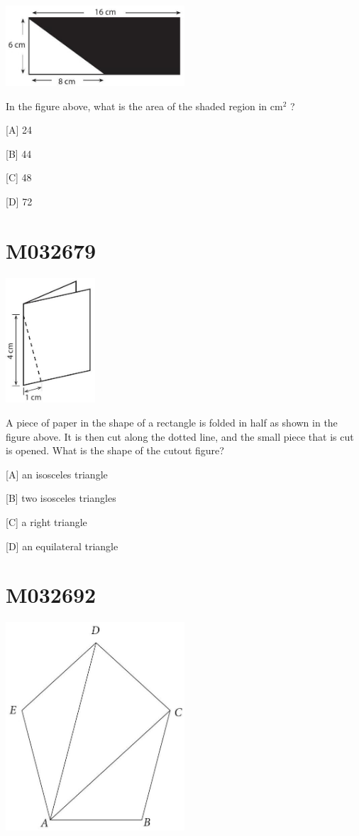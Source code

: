 \documentclass[12pt]{article}
\begin{document}
\includegraphics[max width=0.5\textwidth]{2024_02_20_828ebc9d68bcc1fbb223g-58}


In the figure above, what is the area of the shaded region in $\mathrm{cm}^{2}$ ?

[A] 24

[B] 44

[C] 48

[D] 72

\newpage
\section*{M032679}


\includegraphics[max width=0.25\textwidth]{2024_02_20_828ebc9d68bcc1fbb223g-59}


A piece of paper in the shape of a rectangle is folded in half as shown in the figure above. It is then cut along the dotted line, and the small piece that is cut is opened. What is the shape of the cutout figure?

[A] an isosceles triangle

[B] two isosceles triangles

[C] a right triangle

[D] an equilateral triangle

\newpage
\section*{M032692}


\includegraphics[max width=0.5\textwidth]{2024_02_20_828ebc9d68bcc1fbb223g-60}
\end{document}
